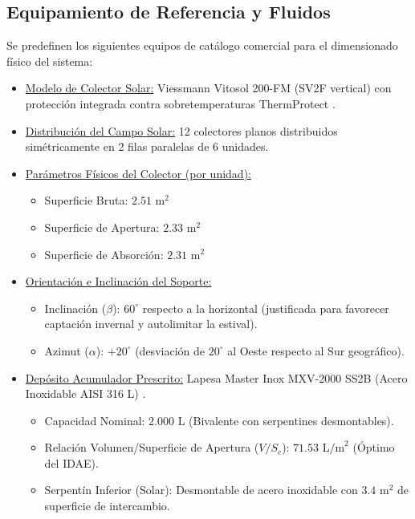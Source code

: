 \documentclass[12pt]{article}
\begin{document}
\subsection{Equipamiento de Referencia y Fluidos}
\label{subsec:equipamiento_y_fluidos}

Se predefinen los siguientes equipos de catálogo comercial para el dimensionado físico del sistema:

\begin{itemize}
    \item \uline{Modelo de Colector Solar:} Viessmann Vitosol 200-FM (SV2F vertical) con protección integrada contra sobretemperaturas ThermProtect \cite{viessmann_vitosol}.
    \item \uline{Distribución del Campo Solar:} 12 colectores planos distribuidos simétricamente en 2 filas paralelas de 6 unidades.
    \item \uline{Parámetros Físicos del Colector (por unidad):}
    \begin{itemize}
        \item Superficie Bruta: $2.51\text{ m}^2$
        \item Superficie de Apertura: $2.33\text{ m}^2$
        \item Superficie de Absorción: $2.31\text{ m}^2$
    \end{itemize}
    \item \uline{Orientación e Inclinación del Soporte:}
    \begin{itemize}
        \item Inclinación ($\beta$): $60^\circ$ respecto a la horizontal (justificada para favorecer captación invernal y autolimitar la estival).
        \item Azimut ($\alpha$): $+20^\circ$ (desviación de $20^\circ$ al Oeste respecto al Sur geográfico).
    \end{itemize}
    \item \uline{Depósito Acumulador Prescrito:} Lapesa Master Inox MXV-2000 SS2B (Acero Inoxidable AISI 316 L) \cite{lapesa_master}.
    \begin{itemize}
        \item Capacidad Nominal: $2.000 \text{ L}$ (Bivalente con serpentines desmontables).
        \item Relación Volumen/Superficie de Apertura ($V/S_c$): $71.53 \text{ L/m}^2$ (Óptimo del IDAE).
        \item Serpentín Inferior (Solar): Desmontable de acero inoxidable con $3.4\text{ m}^2$ de superficie de intercambio.

\end{itemize}
\end{itemize}
\end{document}
